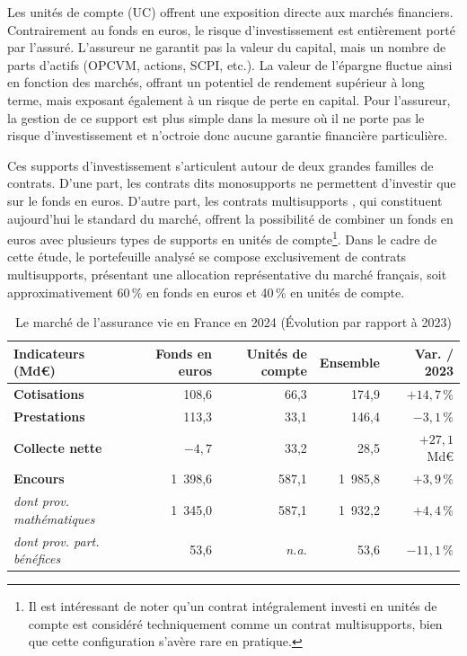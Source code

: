 Les unités de compte (UC) offrent une exposition directe aux marchés financiers. Contrairement au fonds en euros, le risque d'investissement est entièrement porté par l'assuré. L'assureur ne garantit pas la valeur du capital, mais un nombre de parts d'actifs (OPCVM, actions, SCPI, etc.). La valeur de l'épargne fluctue ainsi en fonction des marchés, offrant un potentiel de rendement supérieur à long terme, mais exposant également à un risque de perte en capital. Pour l'assureur, la gestion de ce support est plus simple dans la mesure où il ne porte pas le risque d'investissement et n'octroie donc aucune garantie financière particulière.


Ces supports d'investissement s'articulent autour de deux grandes familles de contrats. D'une part, les contrats dits \og monosupports \fg{} ne permettent d'investir que sur le fonds en euros. D'autre part, les contrats \og multisupports \fg{}, qui constituent aujourd'hui le standard du marché, offrent la possibilité de combiner un fonds en euros avec plusieurs types de supports en unités de compte\footnote{Il est intéressant de noter qu'un contrat intégralement investi en unités de compte est considéré techniquement comme un contrat multisupports, bien que cette configuration s'avère rare en pratique.}. Dans le cadre de cette étude, le portefeuille analysé se compose exclusivement de contrats multisupports, présentant une allocation représentative du marché français, soit approximativement 60\,\% en fonds en euros et 40\,\% en unités de compte.

\begin{table}[htbp]
    \centering
    \renewcommand{\arraystretch}{1.3} 
    \begin{tabular}{@{}lrrrr@{}}
        \toprule
        \textbf{Indicateurs (Md\euro)} & \textbf{Fonds en euros} & \textbf{Unités de compte} & \textbf{Ensemble} & \textbf{Var. / 2023} \\
        \midrule
        \textbf{Cotisations}    & 108,6 & 66,3  & 174,9 & $+14,7\,\%$ \\
        \textbf{Prestations}    & 113,3 & 33,1  & 146,4 & $-3,1\,\%$ \\
        \textbf{Collecte nette} & $-4,7$& 33,2  & 28,5  & $+27,1$ Md\euro{} \\
        \midrule
        \textbf{Encours}        & 1~398,6 & 587,1 & 1~985,8 & $+3,9\,\%$ \\
        \quad \textit{dont prov. mathématiques} & 1~345,0 & 587,1 & 1~932,2 & $+4,4\,\%$ \\
        \quad \textit{dont prov. part. bénéfices} & 53,6 & \textit{n.a.} & 53,6 & $-11,1\,\%$ \\
        \bottomrule
    \end{tabular}
    \caption{Le marché de l'assurance vie en France en 2024 (Évolution par rapport à 2023) \cite{france_assureurs}}
    \label{tab:marches_assurance_vie}
\end{table}

